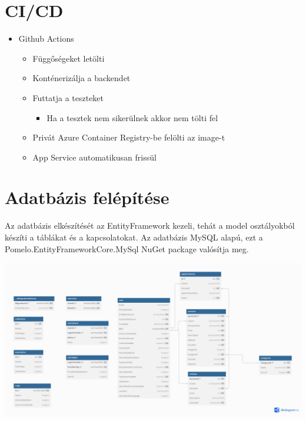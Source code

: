 \documentclass[11pt]{article}
\begin{document}
\section{CI/CD}
\label{sec:orge2c26f6}
\begin{itemize}
\item Github Actions
\begin{itemize}
\item Függőségeket letölti
\item Konténerizálja a backendet
\item Futtatja a teszteket
\begin{itemize}
\item Ha a tesztek nem sikerülnek akkor nem tölti fel
\end{itemize}
\item Privát Azure Container Registry-be felölti az image-t
\item App Service automatikusan frissül
\end{itemize}
\end{itemize}
\section{Adatbázis felépítése}
\label{sec:orgda17720}

Az adatbázis elkészítését az EntityFramework kezeli, tehát a model osztályokból készíti a táblákat és a kapcsolatokat. Az adatbázis MySQL alapú, ezt a Pomelo.EntityFrameworkCore.MySql NuGet package valósítja meg.

\begin{center}
\includegraphics[width=.9\linewidth]{uniPoint.png}
\end{center}
\end{document}
